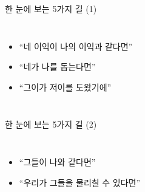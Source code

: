 \documentclass[final]{beamer}
\begin{document}
\begin{frame}[t]{한 눈에 보는 5가지 길 (1)}
	\begin{columns}[c]
		\column{10em}
		\column{20em}
		\vspace{-1em}
		\begin{itemize}
			\item ``네 이익이 나의 이익과 같다면'' \\[4em]
			\item ``네가 나를 돕는다면''\\[5em]
			\item ``그이가 저이를 도왔기에'' 
		\end{itemize}
	\end{columns}
\end{frame}

\begin{frame}[t]{한 눈에 보는 5가지 길 (2)}
	\begin{columns}[c]
		\column{10em}
		\column{20em}
		\vspace{0em}
		\begin{itemize}
			\item ``그들이 나와 같다면'' \\[8em]
			\item ``우리가 그들을 물리칠 수 있다면''
		\end{itemize}
	\end{columns}
\end{frame}
\end{document}
